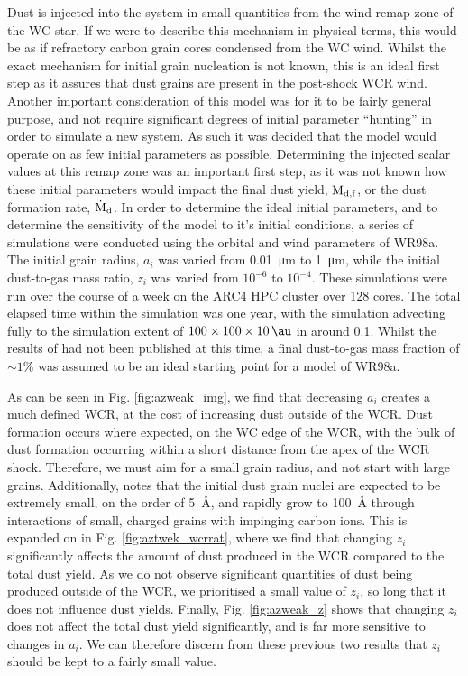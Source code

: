 Dust is injected into the system in small quantities from the wind remap zone of the WC star.
If we were to describe this mechanism in physical terms, this would be as if refractory carbon grain cores condensed from the WC wind.
Whilst the exact mechanism for initial grain nucleation is not known, this is an ideal first step as it assures that dust grains are present in the post-shock WCR wind.
Another important consideration of this model was for it to be fairly general purpose, and not require significant degrees of initial parameter ``hunting'' in order to simulate a new system.
As such it was decided that the model would operate on as few initial parameters as possible.
Determining the injected scalar values at this remap zone was an important first step, as it was not known how these initial parameters would impact the final dust yield, $\text{M}_\text{d,f}$, or the dust formation rate, $\dot{\text{M}}_\text{d}$. 
In order to determine the ideal initial parameters, and to determine the sensitivity of the model to it's initial conditions, a series of simulations were conducted using the orbital and wind parameters of WR98a.
The initial grain radius, $a_i$ was varied from \SI{0.01}{\micro\metre} to \SI{1}{\micro\metre}, while the initial dust-to-gas mass ratio, $z_i$ was varied from $10^{-6}$ to $10^{-4}$.
These simulations were run over the course of a week on the ARC4 HPC cluster over 128 cores.
The total elapsed time within the simulation was one year, with the simulation advecting fully to the simulation extent of $100\times 100 \times 10 \, \si{\au}$ in around \SI{0.1}{\year}.
Whilst the results of \textcite{lauRevealingEfficientDust2021} had not been published at this time, a final dust-to-gas mass fraction of $\sim 1\%$ was assumed to be an ideal starting point for a model of WR98a.


As can be seen in Fig. \ref{fig:azweak_img}, we find that decreasing $a_i$ creates a much defined WCR, at the cost of increasing dust outside of the WCR.
Dust formation occurs where expected, on the WC edge of the WCR, with the bulk of dust formation occurring within a short distance from the apex of the WCR shock.
Therefore, we must aim for a small grain radius, and not start with large grains.
Additionally, \textcite{zubkoPhysicalModelDust1998a} notes that the initial dust grain nuclei are expected to be extremely small, on the order of \SI{5}{\angstrom}, and rapidly grow to \SI{100}{\angstrom} through interactions of small, charged grains with impinging carbon ions.
This is expanded on in Fig. \ref{fig:aztwek_wcrrat}, where we find that changing $z_i$ significantly affects the amount of dust produced in the WCR compared to the total dust yield.
As we do not observe significant quantities of dust being produced outside of the WCR, we prioritised a small value of $z_i$, so long that it does not influence dust yields.
Finally, Fig. \ref{fig:azweak_z} shows that changing $z_i$ does not affect the total dust yield significantly, and is far more sensitive to changes in $a_i$.
We can therefore discern from these previous two results that $z_i$ should be kept to a fairly small value.

